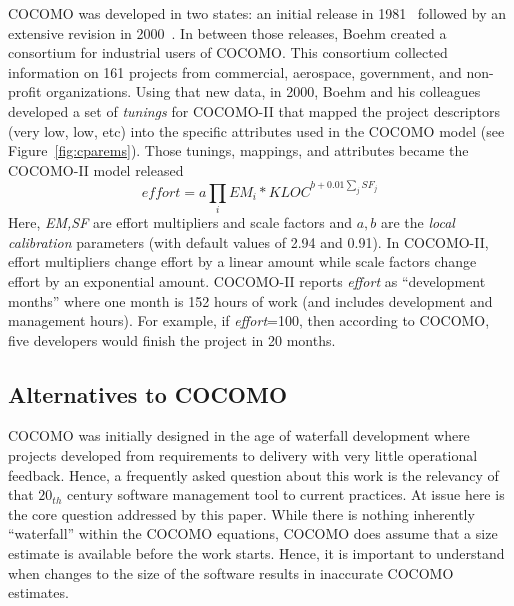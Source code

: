 \documentclass[final,twocolumn,5p]{elsarticle}
\newcommand{\fig}[1]{Figure~\ref{fig:#1}}
\theoremstyle{break}
\begin{document}
  COCOMO was developed in two states: an initial release in 1981~\cite{boehm81}
  followed by an extensive revision in  2000~\cite{boehm00b}.
  In between those releases,
  Boehm created a consortium for
industrial users of COCOMO.
This consortium
collected information on 161 projects from commercial,
aerospace, government, and non-profit organizations.
Using that new data, in 2000, Boehm and his colleagues developed
a set of   {\em tunings} for COCOMO-II that
mapped the project descriptors (very low, low, etc)
into the specific attributes used in the COCOMO model (see \fig{cparems}).
Those tunings, mappings, and attributes became the COCOMO-II model
released 
\begin{equation}\label{eq:cocII}
\mathit{effort}=a\prod_i EM_i *\mathit{KLOC}^{b+0.01\sum_j SF_j}
\end{equation}
Here, {\em EM,SF} are  effort multipliers and scale
factors and
 $a,b$ are the {\em local calibration} parameters (with default values of 2.94 and 0.91).
 In COCOMO-II, effort multipliers change effort by a linear amount
 while scale factors change effort by an exponential amount.
COCOMO-II reports {\em effort}
as ``development months'' where one month
is 152 hours of work  (and includes development and management hours).
For example, if {\em effort}=100, then according to COCOMO,
five developers would finish
the project in 20 months.




 \subsection{Alternatives to COCOMO}

 
COCOMO was initially designed in the age of
waterfall development where projects developed from
requirements to delivery with very little
operational feedback.  Hence, a frequently asked
question about this work is the relevancy of that
$20_{th}$ century software management tool to
current practices.  At issue here is the core
question addressed by this paper.  While there is
nothing inherently ``waterfall'' within the COCOMO
equations, COCOMO does assume that a size estimate
is available before the work starts.  Hence, it is
important to understand when changes to the size of
the software results in inaccurate COCOMO estimates.
\end{document}
